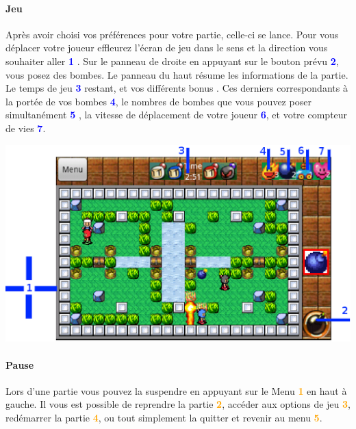 	\paragraph{Jeu\\}
	Après avoir choisi vos préférences pour votre partie, celle-ci se lance.
	Pour vous déplacer votre joueur effleurez l'écran de jeu dans le sens et la
	direction vous souhaiter aller \textcolor{blue}{\textbf{1}} .	
	Sur le panneau de droite en appuyant sur le
	bouton prévu \textcolor{blue}{\textbf{2}}, vous posez des bombes.
	Le panneau du haut résume les informations de la partie. Le temps de jeu
	\textcolor{blue}{\textbf{3}} restant, et vos différents bonus . Ces derniers
	correspondants à la portée de vos bombes \textcolor{blue}{\textbf{4}}, le
	nombres de bombes que vous pouvez poser
	simultanément \textcolor{blue}{\textbf{5}} , la vitesse de déplacement de votre
	joueur \textcolor{blue}{\textbf{6}}, et votre compteur de vies
	\textcolor{blue}{\textbf{7}}.
	
	\begin{center}
		\includegraphics[scale=0.6]{Manuel/Img/21.eps}
	\end{center}
	
	\paragraph{Pause\\}
	Lors d'une partie vous pouvez la suspendre en appuyant sur le Menu
	\textcolor{orange}{\textbf{1}} en haut à gauche. Il vous est possible de
	reprendre la partie \textcolor{orange}{\textbf{2}}, accéder aux options de jeu
	\textcolor{orange}{\textbf{3}}, redémarrer la partie
	\textcolor{orange}{\textbf{4}}, ou tout simplement la quitter et revenir au
	menu \textcolor{orange}{\textbf{5}}. 
	
